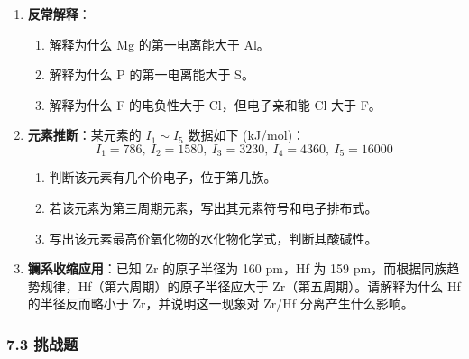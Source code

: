 \documentclass[a4paper,11pt]{ctexart}
\providecommand{\tightlist}{\setlength{\itemsep}{0pt}\setlength{\parskip}{0pt}}
\begin{document}
\begin{enumerate}
\def\labelenumi{\arabic{enumi}.}
\setcounter{enumi}{3}
\tightlist
\item
  \textbf{反常解释}：

  \begin{enumerate}
  \def\labelenumii{(\arabic{enumii})}
  \tightlist
  \item
    解释为什么 Mg 的第一电离能大于 Al。
  \item
    解释为什么 P 的第一电离能大于 S。
  \item
    解释为什么 F 的电负性大于 Cl，但电子亲和能 Cl 大于 F。
  \end{enumerate}
\item
  \textbf{元素推断}：某元素的 \(I_1\sim I_5\) 数据如下 (kJ/mol)：
  \[I_1=786,\ I_2=1580,\ I_3=3230,\ I_4=4360,\ I_5=16000\]

  \begin{enumerate}
  \def\labelenumii{(\arabic{enumii})}
  \tightlist
  \item
    判断该元素有几个价电子，位于第几族。
  \item
    若该元素为第三周期元素，写出其元素符号和电子排布式。
  \item
    写出该元素最高价氧化物的水化物化学式，判断其酸碱性。
  \end{enumerate}
\item
  \textbf{镧系收缩应用}：已知 Zr 的原子半径为 160 pm，Hf 为 159 pm，而根据同族趋势规律，Hf（第六周期）的原子半径应大于 Zr（第五周期）。请解释为什么 Hf 的半径反而略小于 Zr，并说明这一现象对 Zr/Hf 分离产生什么影响。
\end{enumerate}

\subsubsection{7.3 挑战题}\label{ux6311ux6218ux9898}
\end{document}
